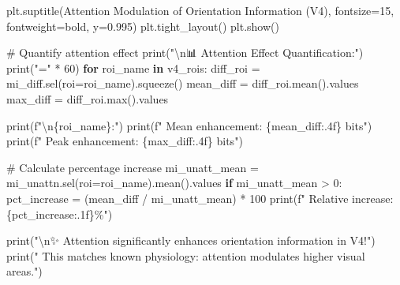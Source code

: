 \documentclass[
  11pt,
  letterpaper,
  oneside,
  openany]{book}
\newenvironment{Shaded}{\begin{snugshade}}{\end{snugshade}}
\newcommand{\BuiltInTok}[1]{\textcolor[rgb]{0.00,0.23,0.31}{#1}}
\newcommand{\CharTok}[1]{\textcolor[rgb]{0.13,0.47,0.30}{#1}}
\newcommand{\CommentTok}[1]{\textcolor[rgb]{0.37,0.37,0.37}{#1}}
\newcommand{\ControlFlowTok}[1]{\textcolor[rgb]{0.00,0.23,0.31}{\textbf{#1}}}
\newcommand{\DecValTok}[1]{\textcolor[rgb]{0.68,0.00,0.00}{#1}}
\newcommand{\FloatTok}[1]{\textcolor[rgb]{0.68,0.00,0.00}{#1}}
\newcommand{\KeywordTok}[1]{\textcolor[rgb]{0.00,0.23,0.31}{\textbf{#1}}}
\newcommand{\NormalTok}[1]{\textcolor[rgb]{0.00,0.23,0.31}{#1}}
\newcommand{\OperatorTok}[1]{\textcolor[rgb]{0.37,0.37,0.37}{#1}}
\newcommand{\SpecialCharTok}[1]{\textcolor[rgb]{0.37,0.37,0.37}{#1}}
\newcommand{\SpecialStringTok}[1]{\textcolor[rgb]{0.13,0.47,0.30}{#1}}
\newcommand{\StringTok}[1]{\textcolor[rgb]{0.13,0.47,0.30}{#1}}
\begin{document}
\begin{Shaded}
\begin{Highlighting}[]
\NormalTok{plt.suptitle(}\StringTok{\textquotesingle{}Attention Modulation of Orientation Information (V4)\textquotesingle{}}\NormalTok{, }
\NormalTok{             fontsize}\OperatorTok{=}\DecValTok{15}\NormalTok{, fontweight}\OperatorTok{=}\StringTok{\textquotesingle{}bold\textquotesingle{}}\NormalTok{, y}\OperatorTok{=}\FloatTok{0.995}\NormalTok{)}
\NormalTok{plt.tight\_layout()}
\NormalTok{plt.show()}

\CommentTok{\# Quantify attention effect}
\BuiltInTok{print}\NormalTok{(}\StringTok{"}\CharTok{\textbackslash{}n}\StringTok{📊 Attention Effect Quantification:"}\NormalTok{)}
\BuiltInTok{print}\NormalTok{(}\StringTok{"="} \OperatorTok{*} \DecValTok{60}\NormalTok{)}
\ControlFlowTok{for}\NormalTok{ roi\_name }\KeywordTok{in}\NormalTok{ v4\_rois:}
\NormalTok{    diff\_roi }\OperatorTok{=}\NormalTok{ mi\_diff.sel(roi}\OperatorTok{=}\NormalTok{roi\_name).squeeze()}
\NormalTok{    mean\_diff }\OperatorTok{=}\NormalTok{ diff\_roi.mean().values}
\NormalTok{    max\_diff }\OperatorTok{=}\NormalTok{ diff\_roi.}\BuiltInTok{max}\NormalTok{().values}
    
    \BuiltInTok{print}\NormalTok{(}\SpecialStringTok{f"}\CharTok{\textbackslash{}n}\SpecialCharTok{\{}\NormalTok{roi\_name}\SpecialCharTok{\}}\SpecialStringTok{:"}\NormalTok{)}
    \BuiltInTok{print}\NormalTok{(}\SpecialStringTok{f"  Mean enhancement: }\SpecialCharTok{\{}\NormalTok{mean\_diff}\SpecialCharTok{:.4f\}}\SpecialStringTok{ bits"}\NormalTok{)}
    \BuiltInTok{print}\NormalTok{(}\SpecialStringTok{f"  Peak enhancement: }\SpecialCharTok{\{}\NormalTok{max\_diff}\SpecialCharTok{:.4f\}}\SpecialStringTok{ bits"}\NormalTok{)}
    
    \CommentTok{\# Calculate percentage increase}
\NormalTok{    mi\_unatt\_mean }\OperatorTok{=}\NormalTok{ mi\_unattn.sel(roi}\OperatorTok{=}\NormalTok{roi\_name).mean().values}
    \ControlFlowTok{if}\NormalTok{ mi\_unatt\_mean }\OperatorTok{\textgreater{}} \DecValTok{0}\NormalTok{:}
\NormalTok{        pct\_increase }\OperatorTok{=}\NormalTok{ (mean\_diff }\OperatorTok{/}\NormalTok{ mi\_unatt\_mean) }\OperatorTok{*} \DecValTok{100}
        \BuiltInTok{print}\NormalTok{(}\SpecialStringTok{f"  Relative increase: }\SpecialCharTok{\{}\NormalTok{pct\_increase}\SpecialCharTok{:.1f\}}\SpecialStringTok{\%"}\NormalTok{)}

\BuiltInTok{print}\NormalTok{(}\StringTok{"}\CharTok{\textbackslash{}n}\StringTok{✨ Attention significantly enhances orientation information in V4!"}\NormalTok{)}
\BuiltInTok{print}\NormalTok{(}\StringTok{"   This matches known physiology: attention modulates higher visual areas."}\NormalTok{)}
\end{Highlighting}
\end{Shaded}
\end{document}
